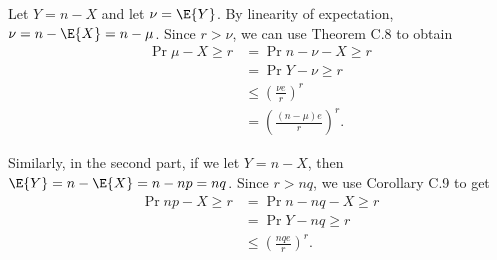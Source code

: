 Let $Y=n-X$ and let $\nu=\E{Y}$.
By linearity of expectation, $\nu=n-\E{X}=n-\mu$.
Since $r>\nu$, we can use Theorem C.8 to obtain
\begin{align*}
    \Pr{\mu-X\ge r} &= \Pr{n-\nu-X\ge r} \\
    &= \Pr{Y-\nu\ge r} \\
    &\le \left(\frac{\nu e}{r}\right)^r \\
    &= \left(\frac{(n-\mu)e}{r}\right)^r.
\end{align*}

Similarly, in the second part, if we let $Y=n-X$, then $\E{Y}=n-\E{X}=n-np=nq$.
Since $r>nq$, we use Corollary C.9 to get
\begin{align*}
    \Pr{np-X\ge r} &= \Pr{n-nq-X\ge r} \\
    &= \Pr{Y-nq\ge r} \\
    &\le \left(\frac{nqe}{r}\right)^r.
\end{align*}

